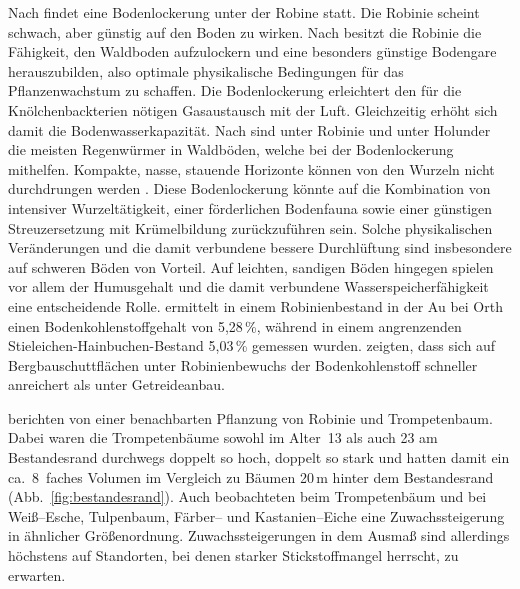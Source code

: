 \documentclass[twocolumn]{scrartcl}
\begin{document}
Nach
\citet[S.~474, 483]{ramann1898influssBodendeckeAufPhysikalischeBodeneigenschaften}
findet eine Bodenlockerung unter der Robine statt.  Die Robinie
scheint schwach, aber günstig auf den Boden zu wirken.
Nach
\citet{albert1926robinieBodenlockerheit,penschuck1931robinieBodenphysik}
besitzt die Robinie die Fähigkeit, den Waldboden aufzulockern und eine
besonders günstige Bodengare herauszubilden, also optimale
physikalische Bedingungen für das Pflanzenwachstum zu schaffen.  Die
Bodenlockerung erleichtert den für die Knölchenbackterien nötigen
Gasaustausch mit der Luft. Gleichzeitig erhöht sich damit die
Bodenwasserkapazität.
Nach \citet{bluemke1955robinie} sind unter Robinie und unter Holunder
die meisten Regenwürmer in Waldböden, welche bei der Bodenlockerung
mithelfen.
Kompakte, nasse, stauende Horizonte können
von den Wurzeln nicht durchdrungen werden \citep{mueller1991robinie}.
Diese Bodenlockerung könnte auf die Kombination von intensiver
Wurzeltätigkeit, einer förderlichen Bodenfauna sowie einer günstigen
Streuzersetzung mit Krümelbildung zurückzuführen sein. Solche
physikalischen Veränderungen und die damit verbundene bessere
Durchlüftung sind insbesondere auf schweren Böden von Vorteil. Auf
leichten, sandigen Böden hingegen spielen vor allem der Humusgehalt
und die damit verbundene Wasserspeicherfähigkeit eine entscheidende
Rolle. \citet{kastler2013robinieBoden} ermittelt in einem
Robinienbestand in der Au bei Orth einen Bodenkohlenstoffgehalt von
5,28\,\%, während in einem angrenzenden Stieleichen-Hainbuchen-Bestand
5,03\,\% gemessen wurden. \citet{kanzler2021robinieBodenc} zeigten,
dass sich auf Bergbauschuttflächen unter Robinienbewuchs der
Bodenkohlenstoff schneller anreichert als unter Getreideanbau.

\citet{ferguson1922robinie,mcintyre1932robinie,chapman1935robinie}
berichten von einer benachbarten Pflanzung von Robinie und
Trompetenbaum. Dabei waren die Trompetenbäume sowohl im Alter~13 als
auch 23 am Bestandesrand durchwegs doppelt so hoch, doppelt so stark
und hatten damit ein ca.\ 8~faches Volumen im Vergleich zu Bäumen
20\,m hinter dem Bestandesrand (Abb.~\ref{fig:bestandesrand}). Auch
\citet{mcintyre1932robinie} beobachteten beim Trompetenbäum und
\citet{chapman1935robinie} bei Weiß--Esche, Tulpenbaum, Färber-- und
Kastanien--Eiche eine Zuwachssteigerung in ähnlicher Größenordnung.
Zuwachssteigerungen in dem Ausmaß sind allerdings höchstens auf
Standorten, bei denen starker Stickstoffmangel herrscht, zu erwarten.
\end{document}
